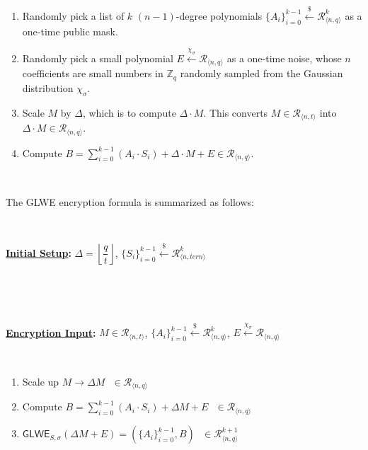 \begin{enumerate}
\item Randomly pick a list of $k$ $(n-1)$-degree polynomials $\{A_i\}_{i=0}^{k-1} \xleftarrow{\$} \mathcal{R}_{\langle n,q \rangle}^{k}$ as a one-time public mask.
\item Randomly pick a small polynomial $E \xleftarrow{\chi_\sigma} \mathcal{R}_{\langle n,q \rangle}$ as a one-time noise, whose $n$ coefficients are small numbers in $\mathbb{Z}_q$ randomly sampled from the Gaussian distribution $\chi_\sigma$. 
\item Scale $M$ by $\Delta$, which is to compute $\Delta \cdot M$. This converts $M \in \mathcal{R}_{\langle n, t \rangle}$ into $\Delta \cdot M \in \mathcal{R}_{\langle n,q \rangle}$.
\item Compute $B = \sum\limits_{i=0}^{k-1}{(A_i \cdot S_i)} + \Delta \cdot M + E \in \mathcal{R}_{\langle n,q \rangle}$. 
\end{enumerate}

$ $

The GLWE encryption formula is summarized as follows:

$ $

\begin{tcolorbox}[title={\textbf{\tboxlabel{\ref*{subsec:glwe-enc}} GLWE Encryption}}]

\textbf{\underline{Initial Setup}:} $\Delta = \left\lfloor\dfrac{q}{t}\right\rfloor$, $\{S_i\}_{i=0}^{k-1} \xleftarrow{\$} \mathcal{R}_{\langle n, \textit{tern} \rangle}^k$

$ $

$ $

\textbf{\underline{Encryption Input}:} $M \in \mathcal{R}_{\langle n, t \rangle}$, $\{A_i\}_{i=0}^{k-1} \xleftarrow{\$} \mathcal{R}_{\langle n,q \rangle}^{k}$, $E \xleftarrow{\chi_\sigma} \mathcal{R}_{\langle n,q \rangle}$

$ $

\begin{enumerate}

\item Scale up $M \longrightarrow \Delta M \text { } \in \mathcal{R}_{\langle n, q\rangle}$

\item Compute $B = \sum\limits_{i=0}^{k-1}{(A_i \cdot S_i)} + \Delta  M + E \text{ } \in \mathcal{R}_{\langle n,q \rangle}$

\item $\textsf{GLWE}_{S,\sigma}(\Delta M + E) = (\{A_i\}_{i=0}^{k-1}, B) \text{ } \in \mathcal{R}_{\langle n,q \rangle}^{k + 1}$ 



\end{enumerate}

\end{tcolorbox}

